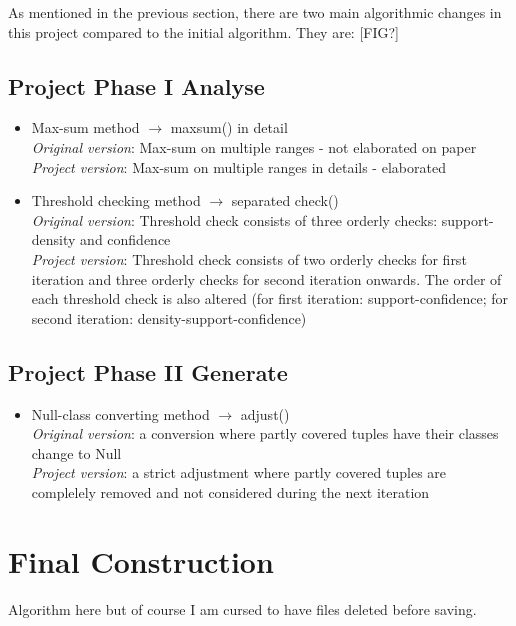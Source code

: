 As mentioned in the previous section, there are two main algorithmic changes in this project compared to the initial algorithm. They are:
[FIG?]

\subsection{Project Phase I Analyse} 

\begin{itemize}
	\item Max-sum method $\rightarrow$ maxsum() in detail \\
	\textit{Original version}: Max-sum on multiple ranges - not elaborated on paper \\
	\textit{Project version}: Max-sum on multiple ranges in details - elaborated \\

	\item Threshold checking method $\rightarrow$ separated check() \\
	\textit{Original version}: Threshold check consists of three orderly checks: support-density and confidence \\
	\textit{Project version}: Threshold check consists of two orderly checks for first iteration and three orderly checks for second iteration onwards. The order of each threshold check is also altered (for first iteration: support-confidence; for second iteration: density-support-confidence) \\
\end{itemize}

\subsection{Project Phase II Generate} 

\begin{itemize}
	\item Null-class converting method $\rightarrow$ adjust() \\
	\textit{Original version}: a conversion where partly covered tuples have their classes change to Null \\
	\textit{Project version}: a strict adjustment where partly covered tuples are complelely removed and not considered during the next iteration \\
\end{itemize}


\section{Final Construction}

Algorithm here but of course I am cursed to have files deleted before saving.




